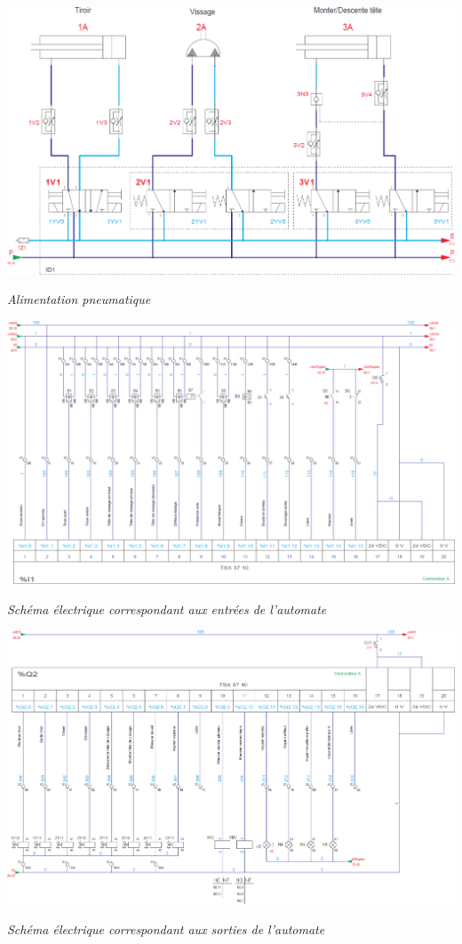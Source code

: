 \documentclass[10pt]{article}
\begin{document}
\begin{center}
\includegraphics[width=.95\textwidth]{images/Pneu01}

\textit{Alimentation pneumatique}
\end{center}


\begin{center}
\includegraphics[width=.95\textwidth]{images/TSX3710_in}

\textit{Schéma électrique correspondant aux entrées de l'automate}
\end{center}

\begin{center}
\includegraphics[width=.95\textwidth]{images/TSX3710_out}

\textit{Schéma électrique correspondant aux sorties de l'automate}
\end{center}
\end{document}
